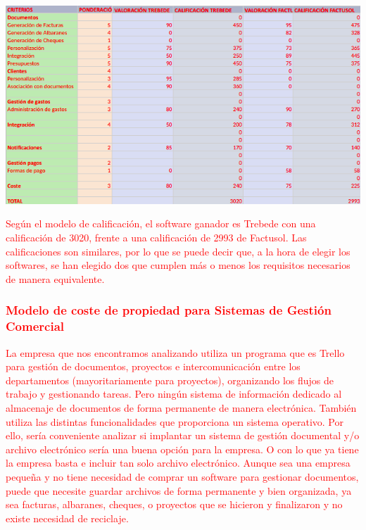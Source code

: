 \documentclass{article}
\begin{document}
\begin{center}
\includegraphics[scale=0.5]{images/calif.png}
\end{center}

\textcolor{Red}{Según el modelo de calificación, el software ganador es Trebede con una calificación de 3020, frente a una calificación de 2993 de Factusol. Las calificaciones son similares, por lo que se puede decir que, a la hora de elegir los softwares, se han elegido dos que cumplen más o menos los requisitos necesarios de manera equivalente.}

\textcolor{Red}{\subsubsection{\textbf{Modelo de coste de propiedad para Sistemas de Gestión Comercial}}}

\textcolor{Red}{La empresa que nos encontramos analizando utiliza un programa que es Trello para gestión de documentos, proyectos e intercomunicación entre los departamentos (mayoritariamente para proyectos), organizando los flujos de trabajo y gestionando tareas. Pero ningún sistema de información dedicado al almacenaje de documentos de forma permanente de manera electrónica. También utiliza las distintas funcionalidades que proporciona un sistema operativo. Por ello, sería conveniente analizar si implantar un sistema de gestión documental y/o archivo electrónico sería una buena opción para la empresa. O con lo que ya tiene la empresa basta e incluir tan solo archivo electrónico. Aunque sea una empresa pequeña y no tiene necesidad de comprar un software para gestionar documentos, puede que necesite guardar archivos de forma permanente y bien organizada, ya sea facturas, albaranes, cheques, o proyectos que se hicieron y finalizaron y no existe necesidad de reciclaje.} 
\end{document}
